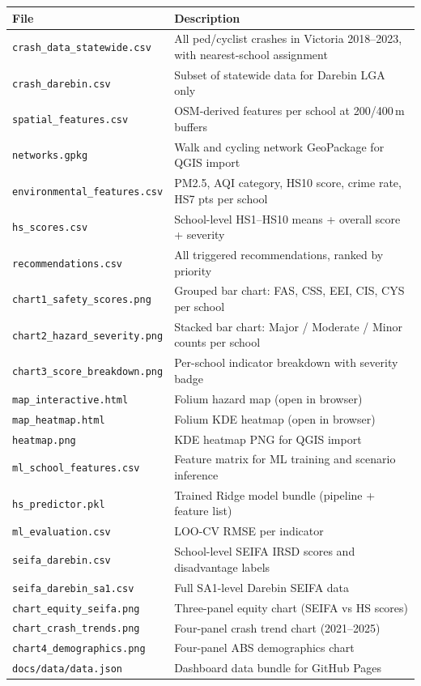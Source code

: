 \documentclass[11pt,a4paper,openany]{book}
\begin{document}
\begin{center}
\begin{tabular}{lL{8.5cm}}
\toprule
File & Description \\
\midrule
\texttt{crash\_data\_statewide.csv}     & All ped/cyclist crashes in Victoria 2018--2023, with nearest-school assignment \\
\texttt{crash\_darebin.csv}             & Subset of statewide data for Darebin LGA only \\
\texttt{spatial\_features.csv}          & OSM-derived features per school at 200/400\,m buffers \\
\texttt{networks.gpkg}                  & Walk and cycling network GeoPackage for QGIS import \\
\texttt{environmental\_features.csv}    & PM2.5, AQI category, HS10 score, crime rate, HS7 pts per school \\
\texttt{hs\_scores.csv}                 & School-level HS1--HS10 means + overall score + severity \\
\texttt{recommendations.csv}            & All triggered recommendations, ranked by priority \\
\texttt{chart1\_safety\_scores.png}     & Grouped bar chart: FAS, CSS, EEI, CIS, CYS per school \\
\texttt{chart2\_hazard\_severity.png}   & Stacked bar chart: Major / Moderate / Minor counts per school \\
\texttt{chart3\_score\_breakdown.png}   & Per-school indicator breakdown with severity badge \\
\texttt{map\_interactive.html}          & Folium hazard map (open in browser) \\
\texttt{map\_heatmap.html}              & Folium KDE heatmap (open in browser) \\
\texttt{heatmap.png}                    & KDE heatmap PNG for QGIS import \\
\texttt{ml\_school\_features.csv}       & Feature matrix for ML training and scenario inference \\
\texttt{hs\_predictor.pkl}              & Trained Ridge model bundle (pipeline + feature list) \\
\texttt{ml\_evaluation.csv}             & LOO-CV RMSE per indicator \\
\texttt{seifa\_darebin.csv}             & School-level SEIFA IRSD scores and disadvantage labels \\
\texttt{seifa\_darebin\_sa1.csv}        & Full SA1-level Darebin SEIFA data \\
\texttt{chart\_equity\_seifa.png}       & Three-panel equity chart (SEIFA vs HS scores) \\
\texttt{chart\_crash\_trends.png}       & Four-panel crash trend chart (2021--2025) \\
\texttt{chart4\_demographics.png}       & Four-panel ABS demographics chart \\
\texttt{docs/data/data.json}            & Dashboard data bundle for GitHub Pages \\
\bottomrule
\end{tabular}
\end{center}
\end{document}
